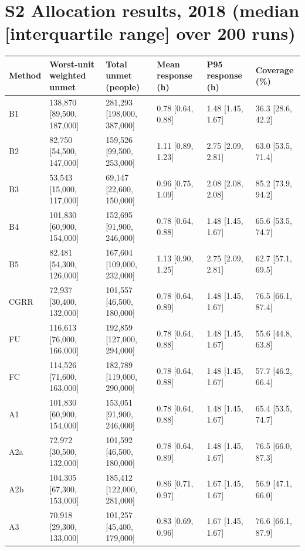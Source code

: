 \documentclass[10pt]{article}
\begin{document}
\section*{S2 Allocation results, 2018 (median [interquartile range] over 200 runs)}\small\begin{tabular}{llllll}\toprule Method & Worst-unit weighted unmet & Total unmet (people) & Mean response (h) & P95 response (h) & Coverage (\%)\\\midrule
B1 & 138,870 [89,500, 187,000] & 281,293 [198,000, 387,000] & 0.78 [0.64, 0.88] & 1.48 [1.45, 1.67] & 36.3 [28.6, 42.2]\\
B2 & 82,750 [54,500, 147,000] & 159,526 [99,500, 253,000] & 1.11 [0.89, 1.23] & 2.75 [2.09, 2.81] & 63.0 [53.5, 71.4]\\
B3 & 53,543 [15,000, 117,000] & 69,147 [22,600, 150,000] & 0.96 [0.75, 1.09] & 2.08 [2.08, 2.08] & 85.2 [73.9, 94.2]\\
B4 & 101,830 [60,900, 154,000] & 152,695 [91,900, 246,000] & 0.78 [0.64, 0.88] & 1.48 [1.45, 1.67] & 65.6 [53.5, 74.7]\\
B5 & 82,481 [54,300, 126,000] & 167,604 [109,000, 232,000] & 1.13 [0.90, 1.25] & 2.75 [2.09, 2.81] & 62.7 [57.1, 69.5]\\
CGRR & 72,937 [30,400, 132,000] & 101,557 [46,500, 180,000] & 0.78 [0.64, 0.89] & 1.48 [1.45, 1.67] & 76.5 [66.1, 87.4]\\
FU & 116,613 [76,000, 166,000] & 192,859 [127,000, 294,000] & 0.78 [0.64, 0.88] & 1.48 [1.45, 1.67] & 55.6 [44.8, 63.8]\\
FC & 114,526 [71,600, 163,000] & 182,789 [119,000, 290,000] & 0.78 [0.64, 0.88] & 1.48 [1.45, 1.67] & 57.7 [46.2, 66.4]\\
A1 & 101,830 [60,900, 154,000] & 153,051 [91,900, 246,000] & 0.78 [0.64, 0.88] & 1.48 [1.45, 1.67] & 65.4 [53.5, 74.7]\\
A2a & 72,972 [30,500, 132,000] & 101,592 [46,500, 180,000] & 0.78 [0.64, 0.89] & 1.48 [1.45, 1.67] & 76.5 [66.0, 87.3]\\
A2b & 104,305 [67,300, 153,000] & 185,412 [122,000, 281,000] & 0.86 [0.71, 0.97] & 1.67 [1.45, 1.67] & 56.9 [47.1, 66.0]\\
A3 & 70,918 [29,300, 133,000] & 101,257 [45,400, 179,000] & 0.83 [0.69, 0.96] & 1.67 [1.45, 1.67] & 76.6 [66.1, 87.9]\\
\bottomrule\end{tabular}
\end{document}
